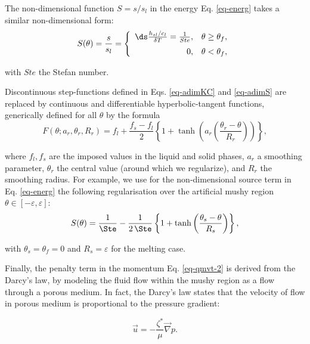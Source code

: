 \noindent The non-dimensional function $S = s/s_l$ in the energy Eq. \eqref{eq-energ} takes a similar non-dimensional form:
\begin{equation}\label{eq-adimS}
S(\theta)= \frac{s}{s_l} =\left\{
\begin{array}{rl} \vspace{0.2cm}
\ds \frac{h_{sl}/c_l}{\delta T} = \frac{1}{Ste}, & \theta \geq \theta_f ,\\
0, & \theta < \theta_f,\\
\end{array}
\right.
\end{equation}

\noindent with $Ste$ the Stefan number.

\noindent Discontinuous step-functions defined in Eqs. \eqref{eq-adimKC}  and \eqref{eq-adimS} are replaced by continuous and differentiable hyperbolic-tangent functions, generically defined for all $\theta$ by the formula \citep{dan-2014-JCP}
\begin{equation}
F(\theta; a_r, \theta_r, R_r) = f_l + \frac{f_s-f_l}{2}\left\{
1 + \tanh\left( a_r \left(\frac{\theta_r-\theta}{R_r}\right)\right)
\right\},
\label{eq-smooth}
\end{equation}

\noindent where $f_l, f_s$ are the imposed values in the liquid and solid phases, $a_r$ a smoothing  parameter, $\theta_r$ the central value (around which we regularize), and $R_r$ the smoothing radius. For example, we use for the non-dimensional source term in Eq. \eqref{eq-energ} the following regularisation over the artificial mushy region $\theta \in [-\varepsilon, \varepsilon]$:
\begin{equation}
S(\theta) = \frac{1}{\Ste} - \frac{1}{2\,\Ste}\left\{
1 + \tanh\left(\frac{\theta_s-\theta}{R_s}\right)
\right\},
\label{eq-Stanh}
\end{equation} 

\noindent with $\theta_s=\theta_f=0$ and $R_s=\varepsilon$ for the melting case. 

Finally, the penalty term in the momentum Eq. \eqref{eq-qmvt-2} is derived from the Darcy's law, by modeling the fluid flow within the mushy region as a flow through a porous medium.
In fact, the Darcy's law states that the velocity of flow in porous medium is proportional to the pressure gradient:

\begin{equation}
	\vec u = - \frac{\zeta^*}{\mu} \vec \nabla p.
\end{equation}

